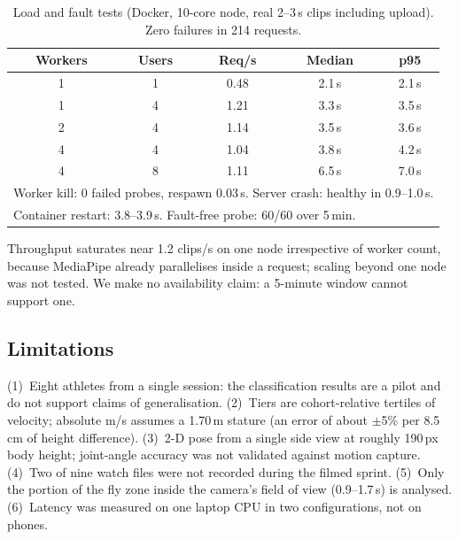 \begin{table}[t]
\caption{Load and fault tests (Docker, 10-core node, real 2--3\,s clips including upload). Zero failures in 214 requests.}
\label{tab:ops}\centering\small
\begin{tabular}{ccccc}
\hline
Workers & Users & Req/s & Median & p95 \\
\hline
1 & 1 & 0.48 & 2.1\,s & 2.1\,s \\
1 & 4 & 1.21 & 3.3\,s & 3.5\,s \\
2 & 4 & 1.14 & 3.5\,s & 3.6\,s \\
4 & 4 & 1.04 & 3.8\,s & 4.2\,s \\
4 & 8 & 1.11 & 6.5\,s & 7.0\,s \\
\hline
\multicolumn{5}{l}{Worker kill: 0 failed probes, respawn 0.03\,s. Server crash: healthy in 0.9--1.0\,s.}\\
\multicolumn{5}{l}{Container restart: 3.8--3.9\,s. Fault-free probe: 60/60 over 5\,min.}\\
\end{tabular}
\end{table}
Throughput saturates near 1.2 clips/s on one node irrespective of worker count, because MediaPipe already parallelises
inside a request; scaling beyond one node was not tested. We make no availability claim: a 5-minute window cannot
support one.

\subsection{Limitations}
(1)~Eight athletes from a single session: the classification results are a
pilot and do not support claims of generalisation.
(2)~Tiers are cohort-relative tertiles of velocity; absolute m/s assumes a
1.70\,m stature (an error of about $\pm$5\% per 8.5\,cm of height difference).
(3)~2-D pose from a single side view at roughly 190\,px body height;
joint-angle accuracy was not validated against motion capture.
(4)~Two of nine watch files were not recorded during the filmed sprint.
(5)~Only the portion of the fly zone inside the camera's field of view
(0.9--1.7\,s) is analysed.
(6)~Latency was measured on one laptop CPU in two configurations, not on
phones.

